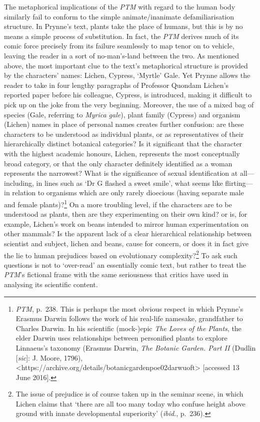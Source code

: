 \documentclass[]{article}
\begin{document}
The metaphorical implications of the \emph{PTM} with regard to the human
body similarly fail to conform to the simple animate/inanimate
defamiliarisation structure. In Prynne's text, plants take the place of
humans, but this is by no means a simple process of substitution. In
fact, the \emph{PTM} derives much of its comic force precisely from its
failure seamlessly to map tenor on to vehicle, leaving the reader in a
sort of no-man's-land between the two. As mentioned above, the most
important clue to the text's metaphorical structure is provided by the
characters' names: Lichen, Cypress, `Myrtle' Gale. Yet Prynne allows the
reader to take in four lengthy paragraphs of Professor Quondam Lichen's
reported paper before his colleague, Cypress, is introduced, making it
difficult to pick up on the joke from the very beginning. Moreover, the
use of a mixed bag of species (Gale, referring to \emph{Myrica gale}),
plant family (Cypress) and organism (Lichen) names in place of personal
names creates further confusion: are these characters to be understood
as individual plants, or as representatives of their hierarchically
distinct botanical categories? Is it significant that the character with
the highest academic honours, Lichen, represents the most conceptually
broad category, or that the only character definitely identified as a
woman represents the narrowest? What is the significance of sexual
identification at all---including, in lines such as `Dr G flashed a
sweet smile', what seems like flirting---in relation to organisms which
are only rarely dioecious (having separate male and female
plants)?\footnote{\emph{PTM}, p.~238. This is perhaps the most obvious
  respect in which Prynne's Erasmus Darwin follows the work of his
  real-life namesake, grandfather to Charles Darwin. In his scientific
  (mock-)epic \emph{The Loves of the Plants}, the elder Darwin uses
  relationships between personified plants to explore Linnaeus's
  taxonomy (Erasmus Darwin, \emph{The Botanic Garden. Part II} (Dudlin
  {[}\emph{sic}{]}: J. Moore, 1796),
  \textless{}https://archive.org/details/botanicgardenpoe02darwuoft\textgreater{}
  {[}accessed 13 June 2016{]}.} On a more troubling level, if the
characters are to be understood as plants, then are they experimenting
on their own kind? or is, for example, Lichen's work on beans intended
to mirror human experimentation on other mammals? Is the apparent lack
of a clear hierarchical relationship between scientist and subject,
lichen and beans, cause for concern, or does it in fact give the lie to
human prejudices based on evolutionary complexity?\footnote{The issue of
  prejudice is of course taken up in the seminar scene, in which Lichen
  claims that `there are all too many today who confuse height above
  ground with innate developmental superiority' (\emph{ibid}., p.~236).}
To ask such questions is not to `over-read' an essentially comic text,
but rather to treat the \emph{PTM}'s fictional frame with the same
seriousness that critics have used in analysing its scientific content.
\end{document}
